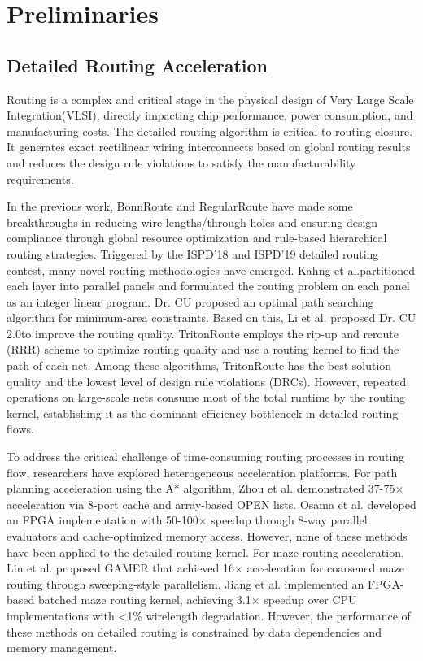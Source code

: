 \documentclass[conference]{IEEEtran}
\begin{document}
\section{Preliminaries}
\subsection{Detailed Routing Acceleration}

Routing is a complex and critical stage in the physical design of Very Large Scale Integration(VLSI), directly impacting chip performance, power consumption, and manufacturing costs. 
The detailed routing algorithm is critical to routing closure. It generates exact rectilinear wiring interconnects based on global routing results and reduces the design rule violations to satisfy the manufacturability requirements.

In the previous work, BonnRoute\cite{Bo2013} and RegularRoute\cite{Re2013} have made some breakthroughs in reducing wire lengths/through holes and ensuring design compliance through global resource optimization and rule-based hierarchical routing strategies. 
Triggered by the ISPD'18\cite{IS2018} and ISPD'19\cite{IS2019} detailed routing contest, many novel routing methodologies have emerged. 
Kahng et al.\cite{Tr2018}partitioned each layer into parallel panels and formulated the routing problem on each panel as an integer linear program. 
Dr. CU\cite{De2019} proposed an optimal path searching algorithm for minimum-area constraints. Based on this, Li et al. proposed Dr. CU 2.0\cite{Dr2019}to improve the routing quality. 
TritonRoute\cite{Tr2021} employs the rip-up and reroute (RRR) scheme to optimize routing quality and use a routing kernel to find the path of each net. 
Among these algorithms, TritonRoute has the best solution quality and the lowest level of design rule violations (DRCs). 
However, repeated operations on large-scale nets consume most of the total runtime by the routing kernel, establishing it as the dominant efficiency bottleneck in detailed routing flows.

To address the critical challenge of time-consuming routing processes in routing flow, researchers have explored heterogeneous acceleration platforms. 
For path planning acceleration using the A* algorithm, Zhou et al.\cite{FP2020} demonstrated 37-75$\times$ acceleration via 8-port cache and array-based OPEN lists. 
Osama et al.\cite{Fa2021} developed an FPGA implementation with 50-100$\times$ speedup through 8-way parallel evaluators and cache-optimized memory access. 
However, none of these methods have been applied to the detailed routing kernel.
For maze routing acceleration, Lin et al.\cite{GA2023} proposed GAMER 
that achieved 16$\times$ acceleration for coarsened maze routing through sweeping-style parallelism. 
Jiang et al.\cite{FP2022} implemented an FPGA-based batched maze routing kernel, achieving 3.1$\times$ speedup over CPU implementations with <1\% wirelength degradation. 
However, the performance of these methods on detailed routing is constrained by data dependencies and memory management.
\end{document}
